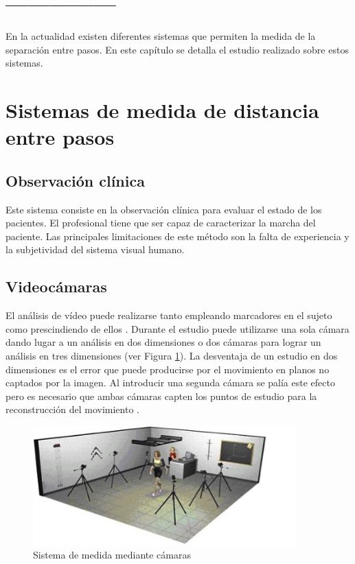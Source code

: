 \section{---------------}

En la actualidad existen diferentes sistemas que permiten la medida de la separación entre pasos. En este capítulo se detalla el estudio realizado sobre estos sistemas.

\section{Sistemas de medida de distancia entre pasos}
	\subsection{Observación clínica}
	Este sistema consiste en la observación clínica para evaluar el estado de los pacientes. El profesional tiene que ser capaz de caracterizar la marcha del paciente. Las principales limitaciones de este método son la falta de experiencia y la subjetividad del sistema visual humano. 
	
	
	\subsection{Videocámaras}
	El análisis de vídeo puede realizarse tanto empleando marcadores en el sujeto como prescindiendo de ellos \cite{techniques2}. Durante el estudio puede utilizarse una sola cámara dando lugar a un análisis en dos dimensiones o dos cámaras para lograr un análisis en tres dimensiones (ver Figura \ref{fig:camera}). \cite{prueba} La desventaja de un estudio en dos dimensiones es el error que puede producirse por el movimiento en planos no captados por la imagen. Al introducir una segunda cámara se palía este efecto pero es necesario que ambas cámaras capten los puntos de estudio para la reconstrucción del movimiento \cite{techniques}.
	\begin{figure}[H]
		\centering
		\includegraphics[width=0.9\textwidth]{./graphics/camera}
		\caption{Sistema de medida mediante cámaras} \label{fig:camera}
	\end{figure}
	
